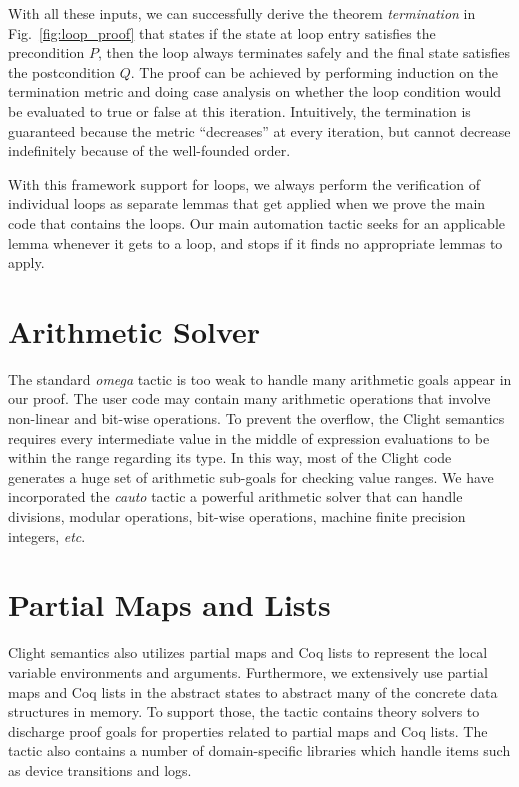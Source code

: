 With all these inputs, we can successfully derive the theorem
{\em termination} in Fig.~\ref{fig:loop_proof} that states
if the state at loop entry satisfies the precondition $P$,
then the loop always terminates safely and the final state
satisfies the postcondition $Q$. The proof can be achieved
by performing induction on the termination metric and doing
case analysis on whether the loop condition would be evaluated
to true or false at this iteration. Intuitively, the termination
is guaranteed because the metric ``decreases'' at every iteration,
but cannot decrease indefinitely because of the well-founded order.

With this framework support for loops, we always perform the verification
of individual loops as separate lemmas that get applied when we prove
the main code that contains the loops. Our main automation tactic
seeks for an applicable lemma whenever it gets to a loop, and stops
if it finds no appropriate lemmas to apply.

\section{Arithmetic Solver}

The standard {\em omega} tactic is too weak to handle many arithmetic
goals appear in our proof. The user code may contain many arithmetic
operations that involve non-linear and bit-wise operations.
To prevent the overflow, the Clight semantics requires every
intermediate value in the middle of expression evaluations to be within the
range regarding its type. In this way, most of the Clight code generates a huge
set of arithmetic sub-goals for checking value ranges. We have incorporated
the {\em cauto} tactic a powerful arithmetic solver that can handle divisions,
modular operations, bit-wise operations, machine finite precision integers, {\it
etc}. 


\section{Partial Maps and Lists}

Clight semantics also utilizes partial maps and Coq lists to represent the local
variable environments and arguments. Furthermore, we extensively use partial
maps and Coq lists in the abstract states to abstract many of the concrete data
structures in memory. To support those, the tactic contains theory solvers to
discharge proof goals for properties related to partial maps and Coq lists. The
tactic also contains a number of domain-specific libraries which handle items
such as device transitions and logs.

